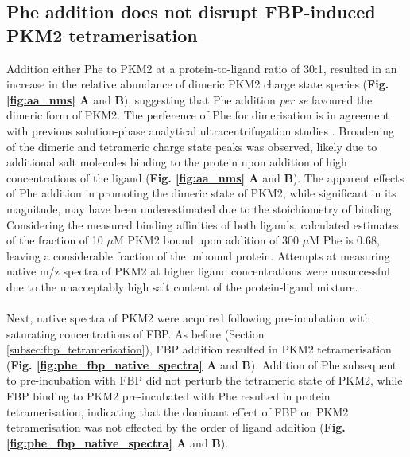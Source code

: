 \subsection{Phe addition does not disrupt FBP-induced PKM2 tetramerisation}
\label{subsec:fbp_phe_nativems}
Addition either Phe to PKM2 at a protein-to-ligand ratio of 30:1, resulted in an increase in the relative abundance of dimeric PKM2 charge state species (\textbf{Fig. \ref{fig:aa_nms} A} and \textbf{B}), suggesting that Phe addition \textit{per se} favoured the dimeric form of PKM2. The perference of Phe for dimerisation is in agreement with previous solution-phase analytical ultracentrifugation studies \cite{Hofmann:1975aa,Feliu:1976aa}. Broadening of the dimeric and tetrameric charge state peaks was observed, likely due to additional salt molecules binding to the protein upon addition of high concentrations of the ligand (\textbf{Fig. \ref{fig:aa_nms} A} and \textbf{B}). The apparent effects of Phe addition in promoting the dimeric state of PKM2, while significant in its magnitude, may have been underestimated due to the stoichiometry of binding. Considering the measured binding affinities of both ligands, calculated estimates of the fraction of 10 $\mu$M PKM2 bound upon addition of 300 $\mu$M Phe is 0.68, leaving a considerable fraction of the unbound protein. Attempts at measuring native m/z spectra of PKM2 at higher ligand concentrations were unsuccessful due to the unacceptably high salt content of the protein-ligand mixture. 
%
%
\\\\
%
%
Next, native spectra of PKM2 were acquired following pre-incubation with saturating concentrations of FBP. As before (Section \ref{subsec:fbp_tetramerisation}), FBP addition resulted in PKM2 tetramerisation (\textbf{Fig. \ref{fig:phe_fbp_native_spectra} A} and \textbf{B}). Addition of Phe subsequent to pre-incubation with FBP did not perturb the tetrameric state of PKM2, while FBP binding to PKM2 pre-incubated with Phe resulted in protein tetramerisation, indicating that the dominant effect of FBP on PKM2 tetramerisation was not effected by the order of ligand addition (\textbf{Fig. \ref{fig:phe_fbp_native_spectra} A} and \textbf{B}).
%
%
%
%
%
